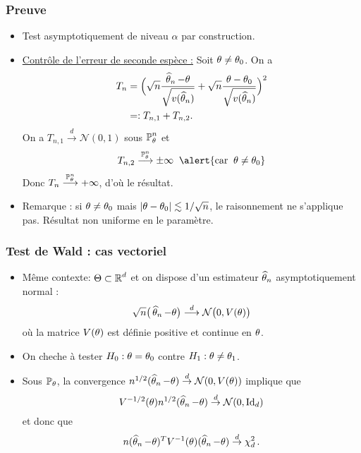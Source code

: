 \begin{frame}
\frametitle{Preuve}
\begin{itemize}
\item Test asymptotiquement de niveau $\alpha$ \alert{par construction}.
\item \underline{Contrôle de l'erreur de seconde espèce :}
Soit $\theta \neq \theta_0$. On a
\begin{align*}
T_n & = \Big(\sqrt{n}\frac{\operatorname{\widehat \theta_{\mathnormal{n}}}-\theta}{\sqrt{v(\operatorname{\widehat \theta_{\mathnormal{n}}})}}+\sqrt{n}\frac{\theta-\theta_0}{\sqrt{v(\operatorname{\widehat \theta_{\mathnormal{n}}})}}\Big)^2 \\
& =: T_{n,1}+T_{n,2}.
\end{align*}
On a $T_{n,1} \stackrel{d}{\longrightarrow} {\mathcal N}(0,1)$ sous $\operatorname{{\mathbb P}}_{\theta}^n$ et
$$T_{n,2} \stackrel{\PP_{\truetheta}^n}{\longrightarrow} \pm \infty\;\;\alert{\text{car}\;\;\truetheta \neq \truetheta_0}$$
Donc $T_{n}\stackrel{\operatorname{{\mathbb P}}_{\theta}^n}{\longrightarrow}+\infty$, d'où le résultat.
\item \alert{Remarque} : si $\theta \neq \theta_0$ mais $|\theta - \theta_0| \lesssim 1/\sqrt{n}$, le raisonnement ne s'applique pas. Résultat \alert{non uniforme en le paramètre}.
\end{itemize}
\end{frame}

\begin{frame}
\frametitle{Test de Wald : cas vectoriel}
\begin{itemize}
\item \alert{ Même contexte:} $\Theta \subset \operatorname{{\mathbb R}}^d$ et \alert{on dispose} d'un estimateur $\operatorname{\widehat \theta_{\mathnormal{n}}}$ asymptotiquement normal :
$$\sqrt{n}\big(\operatorname{\widehat \theta_{\mathnormal{n}}}-\theta\big)\stackrel{d}{\longrightarrow} {\mathcal N}\big(0, V(\theta)\big)$$
où la matrice $V(\theta)$ est \alert{définie positive} et continue en $\theta$.
\item On cheche à tester $H_0: \theta= \theta_0$ contre $H_1: \theta \ne \theta_1$.
\item Sous $\operatorname{{\mathbb P}}_\theta$, la convergence $n^{1/2} (\operatorname{\widehat \theta_{\mathnormal{n}}} - \theta) \stackrel{d}{\rightarrow} \mathcal{N}(0,V(\theta))$ implique que
$$
V^{-1/2}(\theta) n^{1/2} (\operatorname{\widehat \theta_{\mathnormal{n}}} - \theta) \stackrel{d}{\rightarrow} \mathcal{N}(0,\mathrm{Id}_{d})
$$
et donc que
$$
n (\operatorname{\widehat \theta_{\mathnormal{n}}} - \theta)^{T} V^{-1}(\theta) (\operatorname{\widehat \theta_{\mathnormal{n}}} - \theta) \stackrel{d}{\rightarrow} \chi^2_d  \,.
$$
\end{itemize}
\end{frame}

